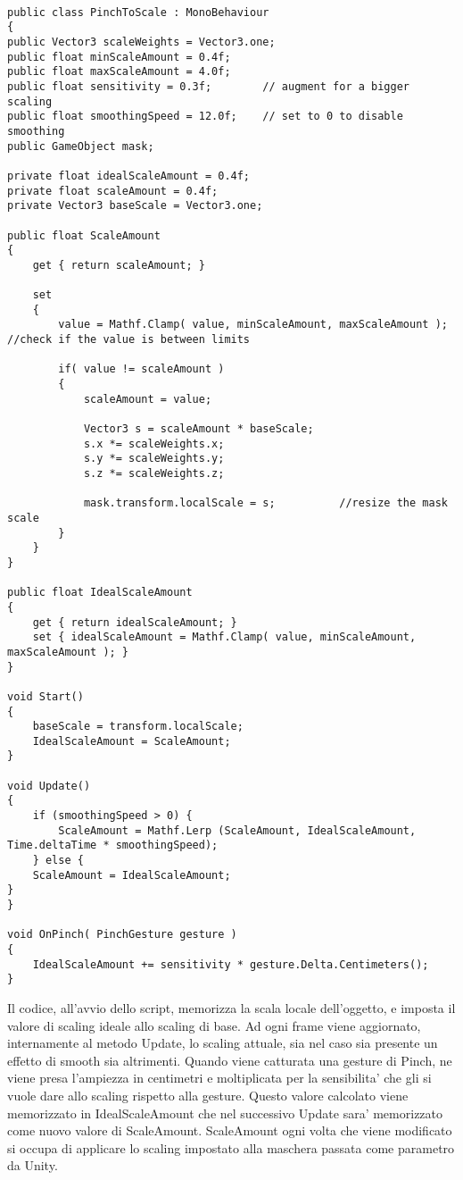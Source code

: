 \begin{lstlisting}

public class PinchToScale : MonoBehaviour
{
public Vector3 scaleWeights = Vector3.one;
public float minScaleAmount = 0.4f;
public float maxScaleAmount = 4.0f;
public float sensitivity = 0.3f;		// augment for a bigger scaling
public float smoothingSpeed = 12.0f;    // set to 0 to disable smoothing
public GameObject mask;

private float idealScaleAmount = 0.4f;
private float scaleAmount = 0.4f;
private Vector3 baseScale = Vector3.one;

public float ScaleAmount
{
	get { return scaleAmount; }
	
	set 
	{ 
		value = Mathf.Clamp( value, minScaleAmount, maxScaleAmount );	//check if the value is between limits
		
		if( value != scaleAmount )
		{
			scaleAmount = value;
			
			Vector3 s = scaleAmount * baseScale;
			s.x *= scaleWeights.x;
			s.y *= scaleWeights.y;
			s.z *= scaleWeights.z;
			
			mask.transform.localScale = s;			//resize the mask scale
		}
	}
}

public float IdealScaleAmount
{
	get { return idealScaleAmount; }
	set { idealScaleAmount = Mathf.Clamp( value, minScaleAmount, maxScaleAmount ); }
}

void Start()
{
	baseScale = transform.localScale;
	IdealScaleAmount = ScaleAmount;
}

void Update()
{
	if (smoothingSpeed > 0) {
		ScaleAmount = Mathf.Lerp (ScaleAmount, IdealScaleAmount, Time.deltaTime * smoothingSpeed);
	} else {
	ScaleAmount = IdealScaleAmount;
}
}

void OnPinch( PinchGesture gesture )
{  
	IdealScaleAmount += sensitivity * gesture.Delta.Centimeters();
} 
\end{lstlisting}

Il codice, all'avvio dello script, memorizza la scala locale dell'oggetto, e imposta il valore di scaling ideale allo scaling di base. Ad ogni frame viene aggiornato, internamente al metodo Update, lo scaling attuale, sia nel caso sia presente un effetto di smooth sia altrimenti. Quando viene catturata una gesture di Pinch, ne viene presa l'ampiezza in centimetri e moltiplicata per la sensibilita' che gli si vuole dare allo scaling rispetto alla gesture. Questo valore calcolato viene memorizzato in IdealScaleAmount che nel successivo Update sara' memorizzato come nuovo valore di ScaleAmount. ScaleAmount ogni volta che viene modificato si occupa di applicare lo scaling impostato alla maschera passata come parametro da Unity.\\\\


